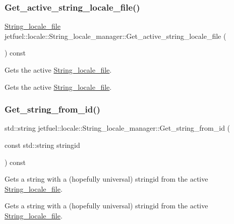 \subsubsection{\texorpdfstring{Get\+\_\+active\+\_\+string\+\_\+locale\+\_\+file()}{Get\_active\_string\_locale\_file()}}
{\footnotesize\ttfamily \hyperlink{classjetfuel_1_1locale_1_1String__locale__file}{String\+\_\+locale\+\_\+file} jetfuel\+::locale\+::\+String\+\_\+locale\+\_\+manager\+::\+Get\+\_\+active\+\_\+string\+\_\+locale\+\_\+file (\begin{DoxyParamCaption}{ }\end{DoxyParamCaption}) const\hspace{0.3cm}{\ttfamily [inline]}}



Gets the active \hyperlink{classjetfuel_1_1locale_1_1String__locale__file}{String\+\_\+locale\+\_\+file}. 

Gets the active \hyperlink{classjetfuel_1_1locale_1_1String__locale__file}{String\+\_\+locale\+\_\+file}. \mbox{\label{classjetfuel_1_1locale_1_1String__locale__manager_a215fa1aaf302e45b1ab375f764a8d101}} 
\subsubsection{\texorpdfstring{Get\+\_\+string\+\_\+from\+\_\+id()}{Get\_string\_from\_id()}}
{\footnotesize\ttfamily std\+::string jetfuel\+::locale\+::\+String\+\_\+locale\+\_\+manager\+::\+Get\+\_\+string\+\_\+from\+\_\+id (\begin{DoxyParamCaption}\item[{const std\+::string}]{stringid }\end{DoxyParamCaption}) const\hspace{0.3cm}{\ttfamily [inline]}}



Gets a string with a (hopefully universal) stringid from the active \hyperlink{classjetfuel_1_1locale_1_1String__locale__file}{String\+\_\+locale\+\_\+file}. 

Gets a string with a (hopefully universal) stringid from the active \hyperlink{classjetfuel_1_1locale_1_1String__locale__file}{String\+\_\+locale\+\_\+file}.


